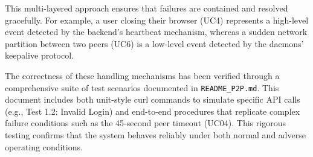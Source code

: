 This multi-layered approach ensures that failures are contained and resolved gracefully. 
For example, a user closing their browser (UC4) represents a high-level event detected by the backend’s heartbeat mechanism, 
whereas a sudden network partition between two peers (UC6) is a low-level event detected by the daemons’ keepalive protocol.

The correctness of these handling mechanisms has been verified through a comprehensive suite of test scenarios documented in \texttt{README\_P2P.md}. This document includes both unit-style curl commands to simulate specific API calls (e.g., Test 1.2: Invalid Login) and end-to-end procedures that replicate complex failure conditions such as the 45-second peer timeout (UC04). This rigorous testing confirms that the system behaves reliably under both normal and adverse operating conditions.

